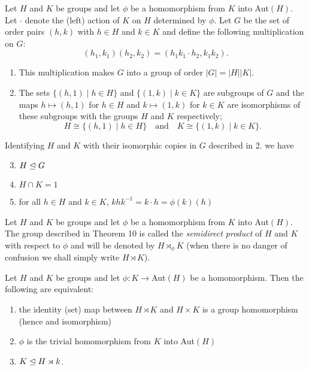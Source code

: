 \documentclass[../main]{subfiles}
\begin{document}
\begin{thm}
 Let $H$ and $K$ be groups and let $\phi$ be a homomorphism from $K$ into Aut$(H)$. Let $\cdot$ denote the (left) action of $K$ on $H$ determined by $\phi$. Let $G$ be the set of order pairs $(h,k)$ with $h \in H$ and $k \in K$ and define the following multiplication on $G$:
 \[ (h_1, k_1) (h_2, k_2) = (h_1 k_1 \cdot h_2, k_1 k_2).\]
 \begin{enumerate}
  \item This multiplication makes $G$ into a group of order $|G| = |H||K|$.
  
  \item The sets $\{(h,1) \mid h \in H \}$ and $\{(1,k) \mid k \in K\}$ are subgroups of $G$ and the maps $h \mapsto (h,1)$ for $h \in H$ and $k \mapsto (1,k)$ for $k \in K$ are isomorphisms of these subgroups with the groups $H$ and $K$ respectively;
  \[ H \cong  \{(h,1) \mid h \in H \} \quad \text{and} \quad K \cong \{(1,k) \mid k \in K\}. \]
 \end{enumerate}
 
 Identifying $H$ and $K$ with their isomorphic copies in $G$ described in 2. we have 
 
  \begin{enumerate}
  \setcounter{enumi}{2} %
   \item $H \trianglelefteq G$
   
   \item $H \cap K = 1$
   
   \item for all $h \in H$ and $k \in K$, $khk^{-1} = k \cdot h = \phi(k)(h)$
  \end{enumerate}
\end{thm}


\begin{dfn}
 Let $H$ and $K$ be groups and let $\phi$ be a homomorphism from $K$ into Aut$(H)$. The group described in Theorem 10 is called the \textit{semidirect product} of $H$ and $K$ with respect to $\phi$ and will be denoted by $H \rtimes_\phi K$ (when there is no danger of confusion we shall simply write $H \rtimes K$).
\end{dfn}


\begin{prop}
 Let $H$ and $K$ be groups and let $\phi \colon K \to$Aut$(H)$ be a homomorphism. Then the following are equivalent:
 \begin{enumerate}
  \item the identity (set) map between $H \rtimes K$ and $H \times K$ is a group homomorphism (hence and isomorphism)
  
  \item $\phi$ is the trivial homomorphism from $K$ into Aut$(H)$
  
  \item $K \trianglelefteq H \rtimes k$.
 \end{enumerate}
\end{prop}
\end{document}
